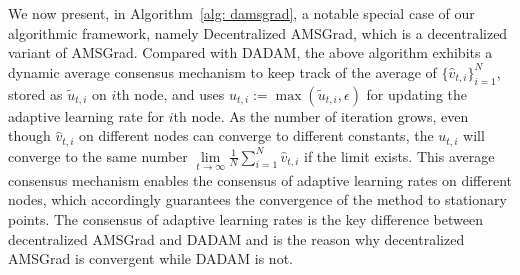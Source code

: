 \documentclass{article} %
\begin{document}
We now present, in Algorithm~\ref{alg: damsgrad}, a notable special case of our algorithmic framework, namely Decentralized AMSGrad, which is a decentralized variant of AMSGrad.
Compared with DADAM, the above algorithm exhibits a dynamic average consensus mechanism to keep track of the average of $\{\hat v_{t,i}\}_{i=1}^N$, stored as $\tilde u_{t,i}$ on $i$th node, and uses $u_{t,i} := \max(\tilde u_{t,i}, \epsilon)$ for updating the adaptive learning rate for $i$th node. 
As the number of iteration grows, even though $\hat v_{t,i}$ on different nodes can converge to different constants, the $u_{t,i}$ will converge to the same number $ \lim \limits_{t \rightarrow \infty} \frac{1}{N} \sum_{i=1}^N\hat v_{t,i} $ if the limit exists. This average consensus mechanism enables the consensus of adaptive learning rates on different nodes, which accordingly guarantees the convergence of the method to stationary points. 
The consensus of adaptive learning rates is the key difference between decentralized AMSGrad and DADAM and is the reason why decentralized AMSGrad is  convergent while DADAM is not.
\end{document}
